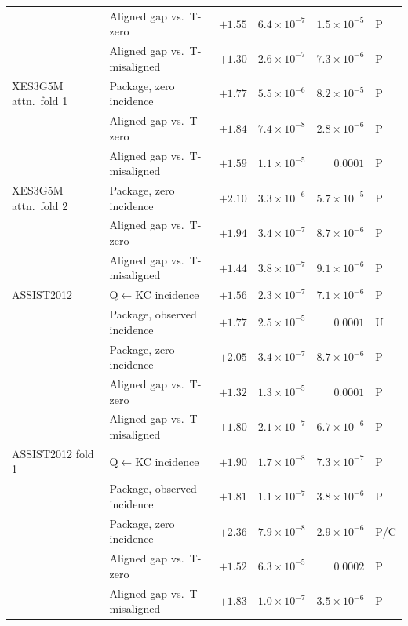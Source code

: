 \begin{table}[tbp]
\begin{tabular}{@{}llrrrl@{}}
 & Aligned gap vs.\ T-zero & $+1.55$ & $6.4\times10^{-7}$ & $1.5\times10^{-5}$ & P \\
 & Aligned gap vs.\ T-misaligned & $+1.30$ & $2.6\times10^{-7}$ & $7.3\times10^{-6}$ & P \\
\addlinespace
XES3G5M attn.\ fold 1 & Package, zero incidence & $+1.77$ & $5.5\times10^{-6}$ & $8.2\times10^{-5}$ & P \\
 & Aligned gap vs.\ T-zero & $+1.84$ & $7.4\times10^{-8}$ & $2.8\times10^{-6}$ & P \\
 & Aligned gap vs.\ T-misaligned & $+1.59$ & $1.1\times10^{-5}$ & $0.0001$ & P \\
\addlinespace
XES3G5M attn.\ fold 2 & Package, zero incidence & $+2.10$ & $3.3\times10^{-6}$ & $5.7\times10^{-5}$ & P \\
 & Aligned gap vs.\ T-zero & $+1.94$ & $3.4\times10^{-7}$ & $8.7\times10^{-6}$ & P \\
 & Aligned gap vs.\ T-misaligned & $+1.44$ & $3.8\times10^{-7}$ & $9.1\times10^{-6}$ & P \\
\addlinespace
ASSIST2012 & Q$\leftarrow$KC incidence & $+1.56$ & $2.3\times10^{-7}$ & $7.1\times10^{-6}$ & P \\
 & Package, observed incidence & $+1.77$ & $2.5\times10^{-5}$ & $0.0001$ & U \\
 & Package, zero incidence & $+2.05$ & $3.4\times10^{-7}$ & $8.7\times10^{-6}$ & P \\
 & Aligned gap vs.\ T-zero & $+1.32$ & $1.3\times10^{-5}$ & $0.0001$ & P \\
 & Aligned gap vs.\ T-misaligned & $+1.80$ & $2.1\times10^{-7}$ & $6.7\times10^{-6}$ & P \\
\addlinespace
ASSIST2012 fold 1 & Q$\leftarrow$KC incidence & $+1.90$ & $1.7\times10^{-8}$ & $7.3\times10^{-7}$ & P \\
 & Package, observed incidence & $+1.81$ & $1.1\times10^{-7}$ & $3.8\times10^{-6}$ & P \\
 & Package, zero incidence & $+2.36$ & $7.9\times10^{-8}$ & $2.9\times10^{-6}$ & P/C \\
 & Aligned gap vs.\ T-zero & $+1.52$ & $6.3\times10^{-5}$ & $0.0002$ & P \\
 & Aligned gap vs.\ T-misaligned & $+1.83$ & $1.0\times10^{-7}$ & $3.5\times10^{-6}$ & P \\
\bottomrule
\end{tabular}
\end{table}

